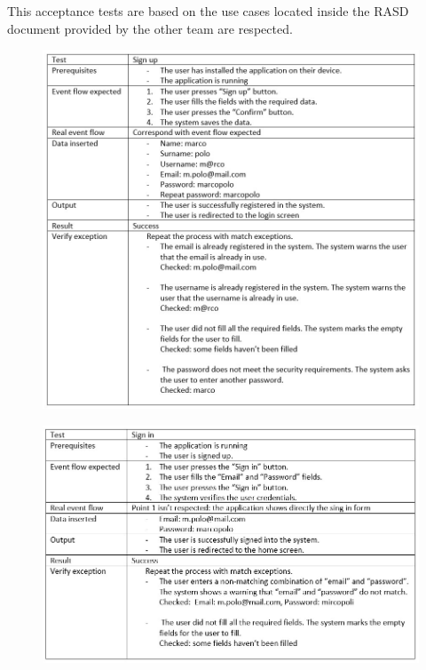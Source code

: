 
This acceptance tests are based on the use cases located inside the RASD document provided by the other team are respected.
\begin{figure}[H]
\centering
\includegraphics[width=\textwidth]{Images/signup.png}
\end{figure}
\newpage
\begin{figure}[H]
\centering
\includegraphics[width=\textwidth]{Images/signin.png}
\end{figure}
